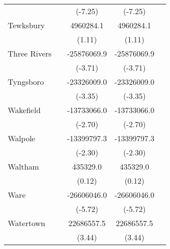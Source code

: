 {\begin{tabular}{l*{4}{c}}
                    &                     &     (-7.25)         &     (-7.25)         &                     \\
\addlinespace
Tewksbury           &                     &   4960284.1         &   4960284.1         &                     \\
                    &                     &      (1.11)         &      (1.11)         &                     \\
\addlinespace
Three Rivers        &                     & -25876069.9\sym{***}& -25876069.9\sym{***}&                     \\
                    &                     &     (-3.71)         &     (-3.71)         &                     \\
\addlinespace
Tyngsboro           &                     & -23326009.0\sym{***}& -23326009.0\sym{***}&                     \\
                    &                     &     (-3.35)         &     (-3.35)         &                     \\
\addlinespace
Wakefield           &                     & -13733066.0\sym{**} & -13733066.0\sym{**} &                     \\
                    &                     &     (-2.70)         &     (-2.70)         &                     \\
\addlinespace
Walpole             &                     & -13399797.3\sym{*}  & -13399797.3\sym{*}  &                     \\
                    &                     &     (-2.30)         &     (-2.30)         &                     \\
\addlinespace
Waltham             &                     &    435329.0         &    435329.0         &                     \\
                    &                     &      (0.12)         &      (0.12)         &                     \\
\addlinespace
Ware                &                     & -26606046.0\sym{***}& -26606046.0\sym{***}&                     \\
                    &                     &     (-5.72)         &     (-5.72)         &                     \\
\addlinespace
Watertown           &                     &  22686557.5\sym{***}&  22686557.5\sym{***}&                     \\
                    &                     &      (3.44)         &      (3.44)         &                     \\

\end{tabular}}
